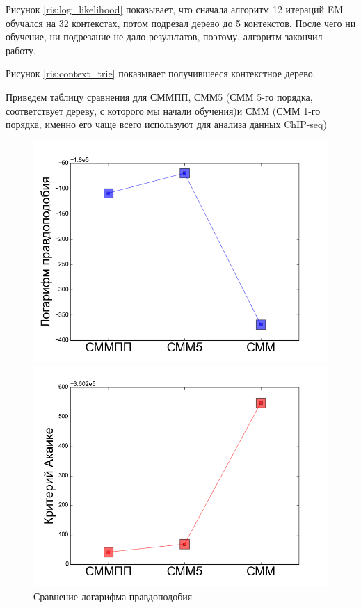 \documentclass{matmex-diploma-custom}
\begin{document}
Рисунок \ref{ris:log_likelihood} показывает, что сначала алгоритм 12 итераций EM обучался на 32 контекстах, потом подрезал дерево до 5 контекстов. После чего ни обучение, ни подрезание не дало результатов, поэтому, алгоритм закончил работу.

Рисунок \ref{ris:context_trie} показывает получившееся контекстное дерево.

Приведем таблицу сравнения для СММПП, СММ5 (СММ 5-го порядка, соответствует дереву, с которого мы начали обучения)и СММ (СММ 1-го порядка, именно его чаще всего используют для анализа данных ChIP-seq)
\begin{figure}[h!]\centering
\begin{minipage}[b]{0.32 \textwidth}
	\includegraphics[scale=0.28]{img/real/log_p.png}
	\centering
	\caption{ Сравнение логарифма правдоподобия}
	\label{ris:real_comp_log_p}
\end{minipage}
\hfill
\begin{minipage}[b]{0.32 \textwidth}
	\includegraphics[scale=0.28]{img/real/aic.png}

\end{minipage}
\end{figure}
\end{document}

